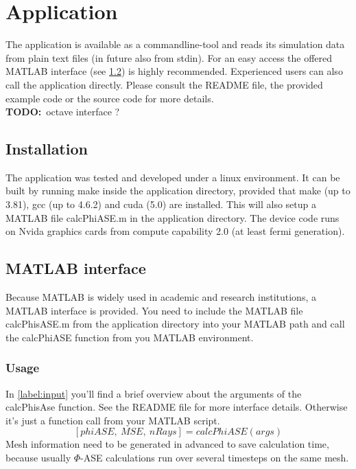 \section{Application}
The application is available as a commandline-tool and reads
its simulation data from plain text files (in future also from stdin).
For an easy access the offered MATLAB interface (see \ref{label:matlab_interface}) 
is highly recommended. Experienced users can also call the application
directly. Please consult the README file, the provided 
example code or the source code for more details.\\
\textbf{TODO:}~octave interface ?

\subsection{Installation}
The application was tested and developed under a linux environment.
It can be built by running make inside the application directory, provided
that make (up to 3.81), gcc (up to 4.6.2) and cuda (5.0) are installed. 
This will also setup a MATLAB file calcPhiASE.m in the application
directory. The device code runs on Nvida graphics cards from compute 
capability 2.0 (at least fermi generation). 

\subsection{MATLAB interface}
\label{label:matlab_interface}
Because MATLAB is widely used in academic and research institutions, a MATLAB
interface is provided. You need to include the MATLAB file calcPhisASE.m from
the application directory into your MATLAB path and call the calcPhiASE function 
from you MATLAB environment.

\subsubsection{Usage}
In \ref{label:input} you'll find a brief overview about the
arguments of the calcPhisAse function. See the README file for 
more interface details. Otherwise it's just a function call from
your MATLAB script.
\[[phiASE,~MSE,~nRays] = calcPhiASE(args)\]
Mesh information need to be generated in advanced
to save calculation time, because usually $\Phi$-ASE calculations
run over several timesteps on the same mesh. 


